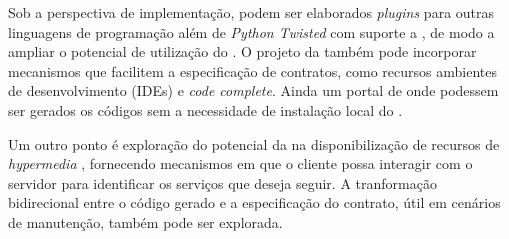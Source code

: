 Sob a perspectiva de implementação, podem ser elaborados \textit{plugins} para
outras linguagens de programação além de \textit{Python Twisted} com suporte a
\designbycontract{}, de modo a ampliar o potencial de utilização do
\framework{}. O projeto da \neoidl{} também pode incorporar mecanismos que
facilitem a especificação de contratos, como recursos ambientes
de desenvolvimento (IDEs) e \textit{code complete}. Ainda um portal de onde
podessem ser gerados os códigos sem a necessidade de instalação local do
\framework{}.

Um outro ponto é exploração do potencial da \neoidl{} na disponibilização de
recursos de \textit{hypermedia} \cite{webber2010rest}, fornecendo mecanismos
em que o cliente possa interagir com o servidor para identificar os serviços
que deseja seguir. A tranformação bidirecional entre o código gerado e a
especificação do contrato, útil em cenários de manutenção, também pode ser
explorada.

